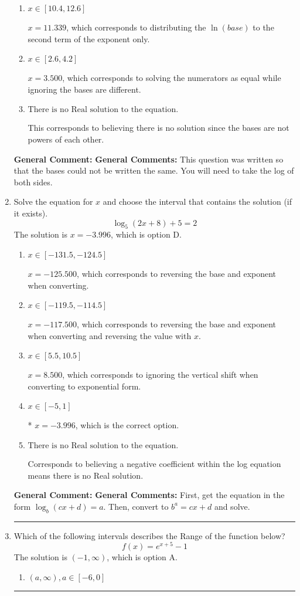 \documentclass{extbook}[14pt]
\newcommand{\litem}[1]{\item #1

\rule{\textwidth}{0.4pt}}
\begin{document}
\begin{enumerate}
{\begin{enumerate}[label=\Alph*.]
* $x = 1.550$, which is the correct option.
\item \( x \in [10.4, 12.6] \)

$x = 11.339$, which corresponds to distributing the $\ln(base)$ to the second term of the exponent only.
\item \( x \in [2.6, 4.2] \)

$x = 3.500$, which corresponds to solving the numerators as equal while ignoring the bases are different.
\item \( \text{There is no Real solution to the equation.} \)

This corresponds to believing there is no solution since the bases are not powers of each other.
\end{enumerate}

\textbf{General Comment:} \textbf{General Comments:} This question was written so that the bases could not be written the same. You will need to take the log of both sides.
}
\litem{
Solve the equation for $x$ and choose the interval that contains the solution (if it exists).
\[ \log_{5}{(2x+8)}+5 = 2 \]The solution is \( x = -3.996 \), which is option D.\begin{enumerate}[label=\Alph*.]
\item \( x \in [-131.5, -124.5] \)

$x = -125.500$, which corresponds to reversing the base and exponent when converting.
\item \( x \in [-119.5, -114.5] \)

$x = -117.500$, which corresponds to reversing the base and exponent when converting and reversing the value with $x$.
\item \( x \in [5.5, 10.5] \)

$x = 8.500$, which corresponds to ignoring the vertical shift when converting to exponential form.
\item \( x \in [-5, 1] \)

* $x = -3.996$, which is the correct option.
\item \( \text{There is no Real solution to the equation.} \)

Corresponds to believing a negative coefficient within the log equation means there is no Real solution.
\end{enumerate}

\textbf{General Comment:} \textbf{General Comments:} First, get the equation in the form $\log_b{(cx+d)} = a$. Then, convert to $b^a = cx+d$ and solve.
}
\litem{
Which of the following intervals describes the Range of the function below?
\[ f(x) = e^{x+5}-1 \]The solution is \( (-1, \infty) \), which is option A.\begin{enumerate}[label=\Alph*.]
\item \( (a, \infty), a \in [-6, 0] \)


\end{enumerate}}
\end{enumerate}
\end{document}
